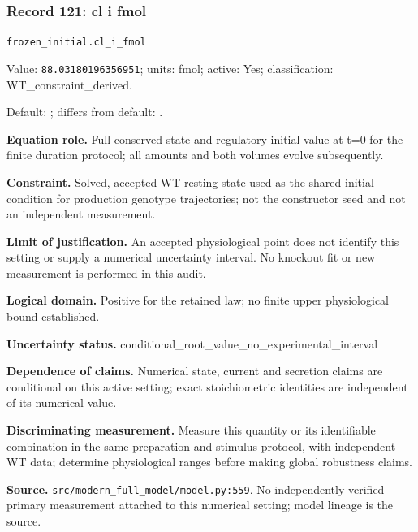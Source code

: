 \subsubsection*{Record 121: cl i fmol}
{\small \nolinkurl{frozen_initial.cl_i_fmol}\par

Value: \texttt{88.03180196356951}; units: fmol; active: Yes; classification: WT\_constraint\_derived.\par

Default: ; differs from default: .\par

\textbf{Equation role.} Full conserved state and regulatory initial value at t=0 for the finite duration protocol; all amounts and both volumes evolve subsequently.\par

\textbf{Constraint.} Solved, accepted WT resting state used as the shared initial condition for production genotype trajectories; not the constructor seed and not an independent measurement.\par

\textbf{Limit of justification.} An accepted physiological point does not identify this setting or supply a numerical uncertainty interval. No knockout fit or new measurement is performed in this audit.\par

\textbf{Logical domain.} Positive for the retained law; no finite upper physiological bound established.\par

\textbf{Uncertainty status.} conditional\_root\_value\_no\_experimental\_interval\par

\textbf{Dependence of claims.} Numerical state, current and secretion claims are conditional on this active setting; exact stoichiometric identities are independent of its numerical value.\par

\textbf{Discriminating measurement.} Measure this quantity or its identifiable combination in the same preparation and stimulus protocol, with independent WT data; determine physiological ranges before making global robustness claims.\par

\textbf{Source.} \nolinkurl{src/modern_full_model/model.py:559}. No independently verified primary measurement attached to this numerical setting; model lineage is the source.\par}

